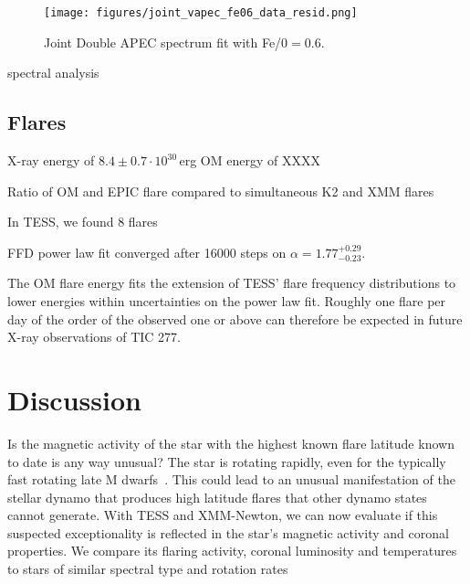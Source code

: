 \documentclass[twocolumn]{aastex631}
\begin{document}
\begin{figure}
    \begin{centering}
        \texttt{[image: figures/joint\_vapec\_fe06\_data\_resid.png]}
        \caption{
         Joint Double APEC spectrum fit with Fe/0$=0.6$.
        }
        \label{fig:spec_joint_all}
    \end{centering}
\end{figure}



spectral analysis



\subsection{Flares}

X-ray energy of $8.4\pm0.7\cdot10^{30}\,$erg
OM energy of XXXX

Ratio of OM and EPIC flare compared to \citet{guarcello2019simultaneous} simultaneous K2 and XMM flares

In TESS, we found 8 flares

FFD power law fit converged after 16000 steps on $\alpha = 1.77_{-0.23}^{+0.29}$.

The OM flare energy fits the extension of TESS' flare frequency distributions to lower energies within uncertainties on the power law fit. Roughly one flare per day of the order of the observed one or above can therefore be expected in future X-ray observations of TIC 277.



\section{Discussion}
\label{sec:discussion}

Is the magnetic activity of the star with the highest known flare latitude known to date is any way unusual? The star is rotating rapidly, even for the typically fast rotating late M dwarfs~\citep{medina2022galactic}. This could lead to an unusual manifestation of the stellar dynamo that produces high latitude flares that other dynamo states cannot generate. With TESS and XMM-Newton, we can now evaluate if this suspected exceptionality is reflected in the star's magnetic activity and coronal properties. We compare its flaring activity, coronal luminosity and temperatures to stars of similar spectral type and rotation rates
\end{document}
